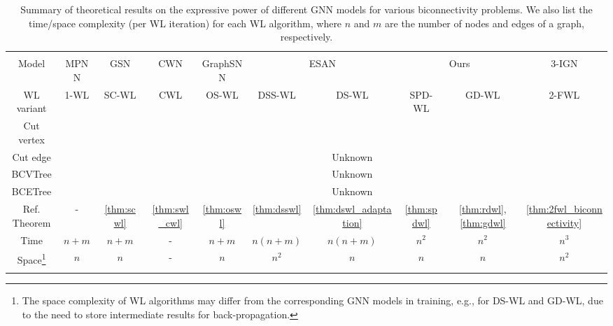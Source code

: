 \documentclass{article}
\newcommand{\cmark}{\ding{51}}
\newcommand{\xmark}{\ding{55}}
\let\cref\crtcref
\begin{document}
\begin{table}[t]
    \vspace{-12pt}
    \centering
    \small
    \setlength\tabcolsep{2pt}
    \caption{Summary of theoretical results on the expressive power of different GNN models for various biconnectivity problems. We also list the time/space complexity (per WL iteration) for each WL algorithm, where $n$ and $m$ are the number of nodes and edges of a graph, respectively.}
    \label{tab:summary_of_results}
    \vspace{2pt}
    \begin{tabular}{c|cccc|cc|cc|c}
    \Xhline{0.75pt}
     & \multicolumn{4}{c|}{\cref{sec:counterexamples}} & \multicolumn{2}{c|}{\cref{sec:esan}}  & \multicolumn{3}{c}{\cref{sec:gdwl}}\\
    \cline{2-10}
    Model & MPNN & GSN & CWN & GraphSNN & \multicolumn{2}{c|}{ESAN} & \multicolumn{2}{c|}{Ours} & 3-IGN\\
    WL variant & 1-WL & SC-WL & CWL & OS-WL & DSS-WL & DS-WL & SPD-WL & GD-WL & 2-FWL\\
    \hline
    Cut vertex & \xmark & \xmark & \xmark & \xmark & \cmark & \xmark & \xmark & \cmark & \cmark \\
    Cut edge & \xmark & \xmark & \xmark & \xmark & \cmark & Unknown & \cmark & \cmark & \cmark \\
    BCVTree & \xmark & \xmark & \xmark & \xmark & \cmark & Unknown & \xmark & \cmark & \cmark \\
    BCETree & \xmark & \xmark & \xmark & \xmark & \cmark & Unknown & \cmark & \cmark & \cmark \\
    \hline
    Ref. Theorem & - & \ref{thm:scwl} & \ref{thm:swl_cwl} & \ref{thm:oswl} & \ref{thm:dsswl} & \ref{thm:dswl_adaptation} & \ref{thm:spdwl} & \ref{thm:rdwl}, \ref{thm:gdwl} & \ref{thm:2fwl_biconnectivity}  \\
    \hline
    Time & $n\!+\!m$ & $n\!+\!m$ & - & $n\!+\!m$ & $n(n\!+\!m)$ & $n(n\!+\!m)$ & $n^2$ & $n^2$ & $n^3$\\
    Space\footnote{The space complexity of WL algorithms may differ from the corresponding GNN models in training, e.g., for DS-WL and GD-WL, due to the need to store intermediate results for back-propagation.} & $n$ & $n$ & - & $n$ & $n^2$ & $n$ & $n$ & $n$ & $n^2$\\
    \Xhline{0.75pt}
    \end{tabular}
    \vspace{-8pt}
\end{table}
\end{document}
